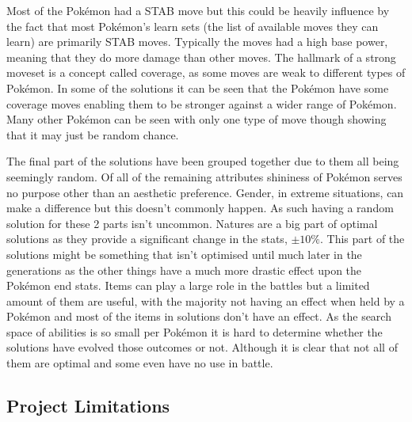\documentclass[a4paper]{article}
\newcommand{\Pokemon}{Pok\'{e}mon}
\begin{document}
Most of the \Pokemon{} had a STAB move but this could be heavily influence by the fact that most \Pokemon{}'s learn sets (the list of available moves they can learn) are primarily STAB moves.
Typically the moves had a high base power, meaning that they do more damage than other moves.
The hallmark of a strong moveset is a concept called coverage, as some moves are weak to different types of \Pokemon{}.
In some of the solutions it can be seen that the \Pokemon{} have some coverage moves enabling them to be stronger against a wider range of \Pokemon{}.
Many other \Pokemon{} can be seen with only one type of move though showing that it may just be random chance.
\par
The final part of the solutions have been grouped together due to them all being seemingly random.
Of all of the remaining attributes shininess of \Pokemon{} serves no purpose other than an aesthetic preference.
Gender, in extreme situations, can make a difference but this doesn't commonly happen.
As such having a random solution for these 2 parts isn't uncommon.
Natures are a big part of optimal solutions as they provide a significant change in the stats, $\pm 10\%$.
This part of the solutions might be something that isn't optimised until much later in the generations as the other things have a much more drastic effect upon the \Pokemon{} end stats.
Items can play a large role in the battles but a limited amount of them are useful, with the majority not having an effect when held by a \Pokemon{} and most of the items in solutions don't have an effect.
As the search space of abilities is so small per \Pokemon{} it is hard to determine whether the solutions have evolved those outcomes or not.
Although it is clear that not all of them are optimal and some even have no use in battle.
\subsection{Project Limitations}
\end{document}
